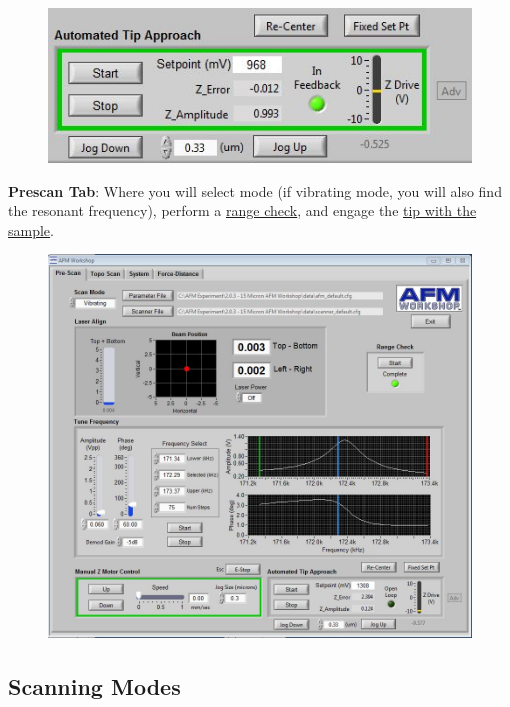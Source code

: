 \documentclass{../lab}
\begin{document}
\begin{figure}[h]
    \centering
    \href{http://experimentationlab.berkeley.edu/sites/default/files/AFMImages/infeedback.JPG}{\includegraphics[width=0.5\linewidth]{images/infeedback.JPG}}
    \label{fig:infeedback}
\end{figure}

\textbf{Prescan Tab}: Where you will select mode (if vibrating mode, you will also find the resonant frequency), perform a \hyperref[subsubsec:RangeCheck]{range check}, and engage the \hyperref[subsec:TipApproach]{tip with the sample}.

\begin{figure}[h]
    \centering
    \href{http://experimentationlab.berkeley.edu/sites/default/files/AFMImages/prescantab.JPG}{\includegraphics[width=0.5\linewidth]{images/prescantab.JPG}}
    \label{fig:prescantab}
\end{figure}

\subsection{Scanning Modes}
\end{document}
